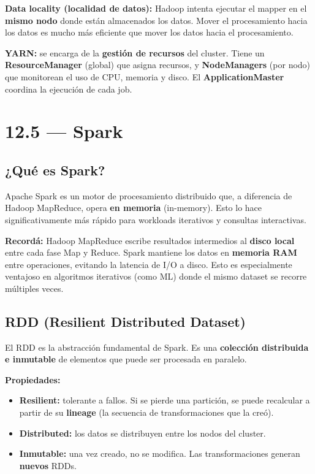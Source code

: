 \documentclass[11pt, a4paper]{article}
\begin{document}
\textbf{Data locality (localidad de datos):} Hadoop intenta ejecutar el mapper en el \textbf{mismo nodo} donde están almacenados los datos. Mover el procesamiento hacia los datos es mucho más eficiente que mover los datos hacia el procesamiento.

\textbf{YARN:} se encarga de la \textbf{gestión de recursos} del cluster. Tiene un \textbf{ResourceManager} (global) que asigna recursos, y \textbf{NodeManagers} (por nodo) que monitorean el uso de CPU, memoria y disco. El \textbf{ApplicationMaster} coordina la ejecución de cada job.

\section{12.5 — Spark}

\subsection{¿Qué es Spark?}

Apache Spark es un motor de procesamiento distribuido que, a diferencia de Hadoop MapReduce, opera \textbf{en memoria} (in-memory). Esto lo hace significativamente más rápido para workloads iterativos y consultas interactivas.

\begin{recallbox}
	\textbf{Recordá:} Hadoop MapReduce escribe resultados intermedios al \textbf{disco local} entre cada fase Map y Reduce. Spark mantiene los datos en \textbf{memoria RAM} entre operaciones, evitando la latencia de I/O a disco. Esto es especialmente ventajoso en algoritmos iterativos (como ML) donde el mismo dataset se recorre múltiples veces.
\end{recallbox}

\subsection{RDD (Resilient Distributed Dataset)}

El RDD es la abstracción fundamental de Spark. Es una \textbf{colección distribuida e inmutable} de elementos que puede ser procesada en paralelo.

\textbf{Propiedades:}
\begin{itemize}
	\item \textbf{Resilient:} tolerante a fallos. Si se pierde una partición, se puede recalcular a partir de su \textbf{lineage} (la secuencia de transformaciones que la creó).
	\item \textbf{Distributed:} los datos se distribuyen entre los nodos del cluster.
	\item \textbf{Inmutable:} una vez creado, no se modifica. Las transformaciones generan \textbf{nuevos} RDDs.
\end{itemize}
\end{document}
